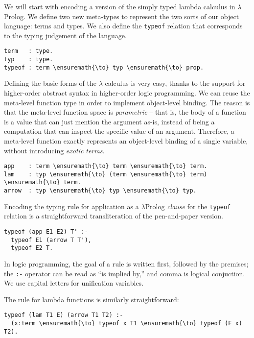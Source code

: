 We will start with encoding a version of the simply typed lambda
calculus in \ensuremath{\lambda}Prolog. We define two new meta-types to represent the two
sorts of our object language: terms and types. We also define the
\texttt{typeof} relation that corresponds to the typing judgement of the
language.

\begin{verbatim}
term   : type.
typ    : type.
typeof : term \ensuremath{\to} typ \ensuremath{\to} prop.
\end{verbatim}

Defining the basic forms of the \ensuremath{\lambda}-calculus is very easy, thanks to the
support for higher-order abstract syntax in higher-order logic
programming. We can reuse the meta-level function type in order to
implement object-level binding. The reason is that the meta-level
function space is \emph{parametric} -- that is, the body of a function
is a value that can just mention the argument as-is, instead of being a
computation that can inspect the specific value of an argument.
Therefore, a meta-level function exactly represents an object-level
binding of a single variable, without introducing \emph{exotic terms}.

\begin{verbatim}
app    : term \ensuremath{\to} term \ensuremath{\to} term.
lam    : typ \ensuremath{\to} (term \ensuremath{\to} term) \ensuremath{\to} term.
arrow  : typ \ensuremath{\to} typ \ensuremath{\to} typ.
\end{verbatim}

Encoding the typing rule for application as a \ensuremath{\lambda}Prolog \emph{clause} for
the \texttt{typeof} relation is a straightforward transliteration of the
pen-and-paper version.

\begin{verbatim}
typeof (app E1 E2) T' :-
  typeof E1 (arrow T T'),
  typeof E2 T.
\end{verbatim}

In logic programming, the goal of a rule is written first, followed by
the premises; the \texttt{:-} operator can be read as ``is implied by,''
and comma is logical conjuction. We use capital letters for unification
variables.

The rule for lambda functions is similarly straightforward:

\begin{verbatim}
typeof (lam T1 E) (arrow T1 T2) :-
  (x:term \ensuremath{\to} typeof x T1 \ensuremath{\to} typeof (E x) T2).
\end{verbatim}


